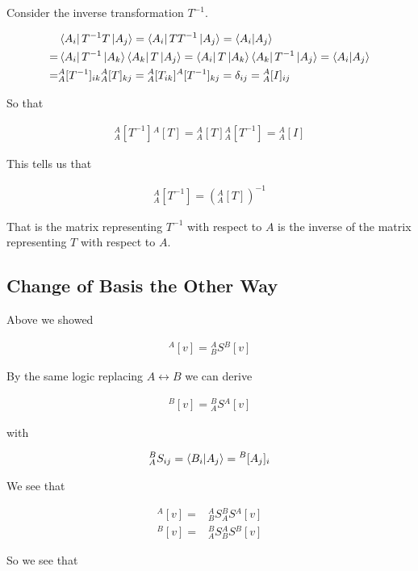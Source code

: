 \documentclass[12pt]{article}
\begin{document}
Consider the inverse transformation $T^{-1}$.

\begin{align}
&\bra{A_i}T^{-1}T\ket{A_j} = \bra{A_i}TT^{-1}\ket{A_j} = \braket{A_i | A_j}\\
=& \bra{A_i}T^{-1}\ket{A_k}\bra{A_k}T\ket{A_j} = \bra{A_i}T\ket{A_k}\bra{A_k}T^{-1}\ket{A_j} = \braket{A_i | A_j}\\
=& {^A_A[T^{-1}]_{ik}} {^A_A[T]_{kj}} = {^A_A[T_{ik}]}{^A[T^{-1}]_{kj}} = \delta_{ij} = {^A_A[I]_{ij}}
\end{align}

So that

\begin{align}
{^A_A[T^{-1}]}{^A[T]} = {^A_A[T]}{^A_A[T^{-1}]} = {^A_A[I]}
\end{align}

This tells us that

\begin{align}
{^A_A[T^{-1}]} = \left({^A_A[T]}\right)^{-1}
\end{align}

That is the matrix representing $T^{-1}$ with respect to $A$ is the inverse of the matrix representing $T$ with respect to $A$.

\subsection{Change of Basis the Other Way}

Above we showed

\begin{align}
{^A[v]} = {^A_B S} {^B[v]}
\end{align}

By the same logic replacing $A\leftrightarrow B$ we can derive

\begin{align}
{^B[v]} = {^B_A S} {^A[v]}
\end{align}

with

\begin{align}
{^B_A S_{ij}} = \braket{B_i | A_j} = {^B[A_j]_i}
\end{align}

We see that

\begin{align}
{^A[v]} =& {^A_B S} {^B_A S} {^A[v]}\\
{^B[v]} =& {^B_A S} {^A_B S} {^B[v]}
\end{align}

So we see that
\end{document}
